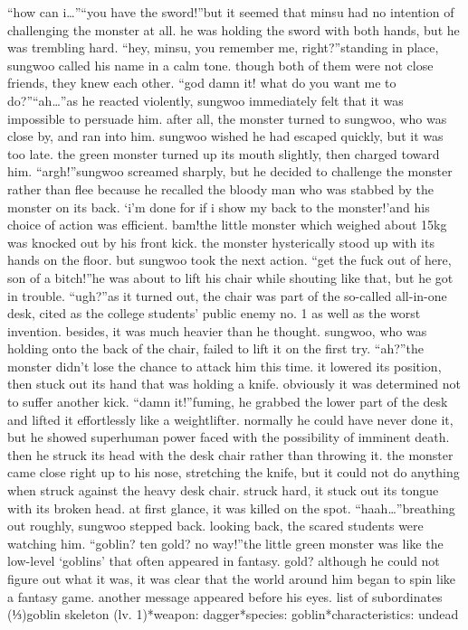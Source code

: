 “how can i…”“you have the sword!”but it seemed that minsu had no intention of challenging the monster at all.
 he was holding the sword with both hands, but he was trembling hard.
“hey, minsu, you remember me, right?”standing in place, sungwoo called his name in a calm tone.
 though both of them were not close friends, they knew each other.
“god damn it! what do you want me to do?”“ah…”as he reacted violently, sungwoo immediately felt that it was impossible to persuade him.
after all, the monster turned to sungwoo, who was close by, and ran into him.
sungwoo wished he had escaped quickly, but it was too late.
 the green monster turned up its mouth slightly, then charged toward him.
“argh!”sungwoo screamed sharply, but he decided to challenge the monster rather than flee because he recalled the bloody man who was stabbed by the monster on its back.
‘i’m done for if i show my back to the monster!’and his choice of action was efficient.
bam!the little monster which weighed about 15kg was knocked out by his front kick.
the monster hysterically stood up with its hands on the floor.
 but sungwoo took the next action.
“get the fuck out of here, son of a bitch!”he was about to lift his chair while shouting like that, but he got in trouble.
“ugh?”as it turned out, the chair was part of the so-called all-in-one desk, cited as the college students’ public enemy no.
 1 as well as the worst invention.
 besides, it was much heavier than he thought.
sungwoo, who was holding onto the back of the chair, failed to lift it on the first try.
“ah?”the monster didn’t lose the chance to attack him this time.
 it lowered its position, then stuck out its hand that was holding a knife.
 obviously it was determined not to suffer another kick.
“damn it!”fuming, he grabbed the lower part of the desk and lifted it effortlessly like a weightlifter.
 normally he could have never done it, but he showed superhuman power faced with the possibility of imminent death.
then he struck its head with the desk chair rather than throwing it.
the monster came close right up to his nose, stretching the knife, but it could not do anything when struck against the heavy desk chair.
struck hard, it stuck out its tongue with its broken head.
 at first glance, it was killed on the spot.
“haah…”breathing out roughly, sungwoo stepped back.
 looking back, the scared students were watching him.
“goblin? ten gold? no way!”the little green monster was like the low-level ‘goblins’ that often appeared in fantasy.
 gold? although he could not figure out what it was, it was clear that the world around him began to spin like a fantasy game.
another message appeared before his eyes.
list of subordinates (⅓)goblin skeleton (lv.
1)*weapon: dagger*species: goblin*characteristics: undead

